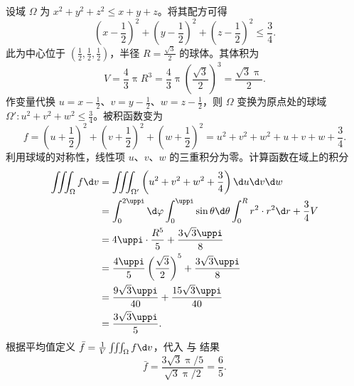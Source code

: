 \begin{solution}
    设域 $\Omega$ 为 $x^2 + y^2 + z^2 \leqslant x + y + z$。将其配方可得
    \begin{equation}\label{eq:Domain-Center-1}
        \left( x - \frac{1}{2} \right)^2 + \left( y - \frac{1}{2} \right)^2 + \left( z - \frac{1}{2} \right)^2 \leqslant \frac{3}{4}.
    \end{equation}
    此为中心位于 $(\frac{1}{2}, \frac{1}{2}, \frac{1}{2})$，半径 $R = \frac{\sqrt{3}}{2}$ 的球体。其体积为
    \begin{equation}\label{eq:Volume-1}
        V = \frac{4}{3} \uppi R^3 = \frac{4}{3} \uppi \left( \frac{\sqrt{3}}{2} \right)^3 = \frac{\sqrt{3} \uppi}{2}.
    \end{equation}
    作变量代换 $u = x - \frac{1}{2}$、$v = y - \frac{1}{2}$、$w = z - \frac{1}{2}$，则 $\Omega$ 变换为原点处的球域 $\Omega': u^2 + v^2 + w^2 \leqslant \frac{3}{4}$。被积函数变为
    \begin{equation}\label{eq:Function-Decomp-1}
        f = \left( u + \frac{1}{2} \right)^2 + \left( v + \frac{1}{2} \right)^2 + \left( w + \frac{1}{2} \right)^2 = u^2 + v^2 + w^2 + u + v + w + \frac{3}{4}.
    \end{equation}
    利用球域的对称性，线性项 $u$、$v$、$w$ 的三重积分为零。计算函数在域上的积分
    \begin{equation}\label{eq:Integral-Calculation-1}
        \begin{aligned}
            \iiint_{\Omega} f \d v & = \iiint_{\Omega'} \left( u^2 + v^2 + w^2 + \frac{3}{4} \right) \d u \d v \d w                                         \\
                                   & = \int_{0}^{2 \uppi} \d \varphi \int_{0}^{\uppi} \sin \theta \d \theta \int_{0}^{R} r^2 \cdot r^2 \d r + \frac{3}{4} V \\
                                   & = 4 \uppi \cdot \frac{R^5}{5} + \frac{3 \sqrt{3} \uppi}{8}                                                             \\
                                   & = \frac{4 \uppi}{5} \left( \frac{\sqrt{3}}{2} \right)^5 + \frac{3 \sqrt{3} \uppi}{8}                                   \\
                                   & = \frac{9 \sqrt{3} \uppi}{40} + \frac{15 \sqrt{3} \uppi}{40}                                                           \\
                                   & = \frac{3 \sqrt{3} \uppi}{5}.
        \end{aligned}
    \end{equation}
    根据平均值定义 $\bar{f} = \frac{1}{V} \iiint_{\Omega} f \d v$，代入  与  结果
    \begin{equation}
        \bar{f} = \frac{3 \sqrt{3} \uppi / 5}{\sqrt{3} \uppi / 2} = \boxed{\frac{6}{5}}.
    \end{equation}
\end{solution}

